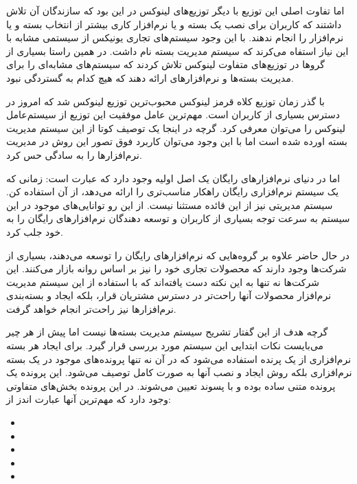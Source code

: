 اما تفاوت اصلی این توزیع با دیگر توزیع‌های لینوکس در این بود که سازندگان آن تلاش
داشتند که کاربران برای نصب یک بسته و یا نرم‌افزار کاری بیشتر از انتخاب بسته و یا
نرم‌افزار را انجام ندهند. با این وجود سیستم‌های تجاری یونیکس از سیستمی مشابه با
این نیاز استفاه می‌کرند که سیستم مدیریت بسته نام
داشت. در همین راستا بسیاری از گروها در توزیع‌های متفاوت لینوکس تلاش کردند که
سیستم‌های مشابه‌ای را برای مدیریت بسته‌ها و نرم‌افزارهای ارائه دهند که هیچ کدام
به گستردگی  نبود.

با گذر زمان توزیع کلاه قرمز لینوکس محبوب‌ترین توزیع لینوکس شد که امروز در دسترس
بسیاری از کاربران است. مهم‌ترین عامل موفقیت این توزیع از سیستم‌عامل لینوکس را
می‌توان  معرفی کرد. گرچه در اینجا یک توصیف کوتا از این سیستم مدیریت بسته
اورده شده است اما با این وجود می‌توان کاربرد فوق تصور این روش در مدیریت
نرم‌افزارها را به سادگی حس کرد.

اما در دنیای نرم‌افزارهای رایگان یک اصل اولیه وجود دارد که عبارت است: زمانی که
یک سیستم نرم‌افزاری رایگان راهکار مناسب‌تری را ارائه می‌دهد، از آن استفاده کن.
سیستم مدیریتی  نیز از این قائده مستثنا نیست. از این رو توانایی‌های
موجود در این سیستم به سرعت توجه بسیاری از کاربران و توسعه دهندگان نرم‌افزارهای
رایگان را به خود جلب کرد.

در حال حاضر علاوه بر گروه‌هایی که نرم‌افزارهای رایگان  را توسعه می‌دهند، بسیاری
از شرکت‌ها وجود دارند که محصولات تجاری خود را نیز بر اساس  روانه بازار
می‌کنند. این شرکت‌ها نه تنها به این نکته دست یافته‌اند که با استفاده از این
سیستم مدیریت نرم‌افزار محصولات آنها راحت‌تر در دسترس مشتریان قرار،
بلکه ایجاد و بسته‌بندی نرم‌افزارها نیز راحت‌تر انجام خواهد گرفت.

گرچه هدف از این گفتار تشریح سیستم مدیریت بسته‌ها نیست اما پیش از هر چیر می‌بایست
نکات ابتدایی این سیستم مورد بررسی قرار گیرد. برای ایجاد هر بسته نرم‌افزاری از یک
پرنده استفاده می‌شود که در آن نه تنها پرونده‌های موجود در یک بسته نرم‌افزاری
بلکه روش ایجاد و نصب آنها به صورت کامل توصیف می‌شود. این پرونده یک پرونده متنی
ساده بوده و با پسوند  تعیین می‌شوند. در این پرونده بخش‌های متفاوتی وجود
دارد که مهم‌ترین آنها عبارت اندز از:

\begin{itemize}
  \item {}
  \item {}
  \item {}
  \item {}
  \item {}
\end{itemize}

